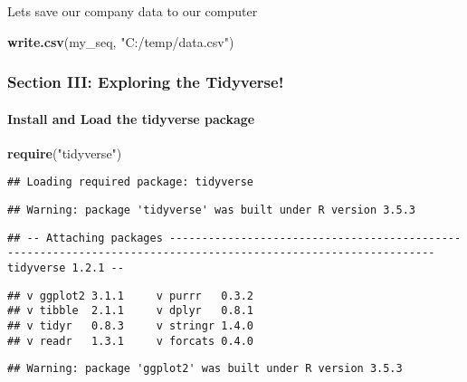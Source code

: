 \documentclass[]{article}
\newenvironment{Shaded}{\begin{snugshade}}{\end{snugshade}}
\newcommand{\KeywordTok}[1]{\textcolor[rgb]{0.13,0.29,0.53}{\textbf{#1}}}
\newcommand{\StringTok}[1]{\textcolor[rgb]{0.31,0.60,0.02}{#1}}
\newcommand{\NormalTok}[1]{#1}
\let\oldparagraph\paragraph
\renewcommand{\paragraph}[1]{\oldparagraph{#1}\mbox{}}
\begin{document}
Lets save our company data to our computer

\begin{Shaded}
\begin{Highlighting}[]
\KeywordTok{write.csv}\NormalTok{(my_seq, }\StringTok{"C:/temp/data.csv"}\NormalTok{)}
\end{Highlighting}
\end{Shaded}

\subsubsection{Section III: Exploring the
Tidyverse!}\label{section-iii-exploring-the-tidyverse}

\paragraph{Install and Load the tidyverse
package}\label{install-and-load-the-tidyverse-package}

\begin{Shaded}
\begin{Highlighting}[]
\KeywordTok{require}\NormalTok{(}\StringTok{"tidyverse"}\NormalTok{)}
\end{Highlighting}
\end{Shaded}

\begin{verbatim}
## Loading required package: tidyverse
\end{verbatim}

\begin{verbatim}
## Warning: package 'tidyverse' was built under R version 3.5.3
\end{verbatim}

\begin{verbatim}
## -- Attaching packages --------------------------------------------------------------------------------------------------------------- tidyverse 1.2.1 --
\end{verbatim}

\begin{verbatim}
## v ggplot2 3.1.1     v purrr   0.3.2
## v tibble  2.1.1     v dplyr   0.8.1
## v tidyr   0.8.3     v stringr 1.4.0
## v readr   1.3.1     v forcats 0.4.0
\end{verbatim}

\begin{verbatim}
## Warning: package 'ggplot2' was built under R version 3.5.3
\end{verbatim}
\end{document}
